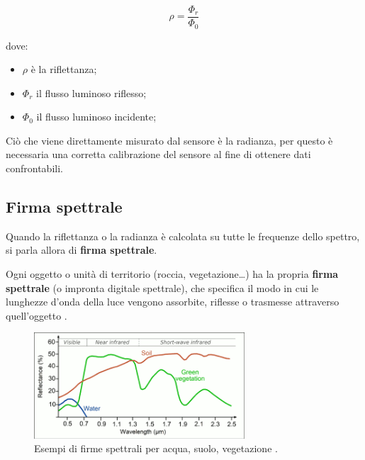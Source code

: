 \begin{equation}
    \rho = \frac{\Phi_r}{\Phi_0}
\end{equation}

dove:
\begin{itemize}
    \item $\rho$ è la riflettanza;
    \item $\Phi_r$ il flusso luminoso riflesso;
    \item $\Phi_0$ il flusso luminoso incidente;
\end{itemize}
Ciò che viene direttamente misurato dal sensore è la radianza, per questo è necessaria una corretta 
calibrazione del sensore al fine di ottenere dati confrontabili.



\subsection{Firma spettrale}
Quando la riflettanza o la radianza è calcolata su tutte le frequenze dello spettro, 
si parla allora di \textbf{firma spettrale}. 

Ogni oggetto o unità di territorio (roccia, vegetazione…) ha la propria \textbf{firma spettrale} (o impronta digitale spettrale), 
che specifica il modo in cui le lunghezze d'onda della luce vengono assorbite, riflesse o trasmesse attraverso 
quell'oggetto \cite{Firma_spettare}. %

\begin{figure}[H]
    \centering
    \includegraphics[width=0.70\textwidth]{Immagini/Generiche/spectral_sign.png}
    \caption{Esempi di firme spettrali per acqua, suolo, vegetazione \cite{ALL2_REMOTE_SENSING}.}
\end{figure}

